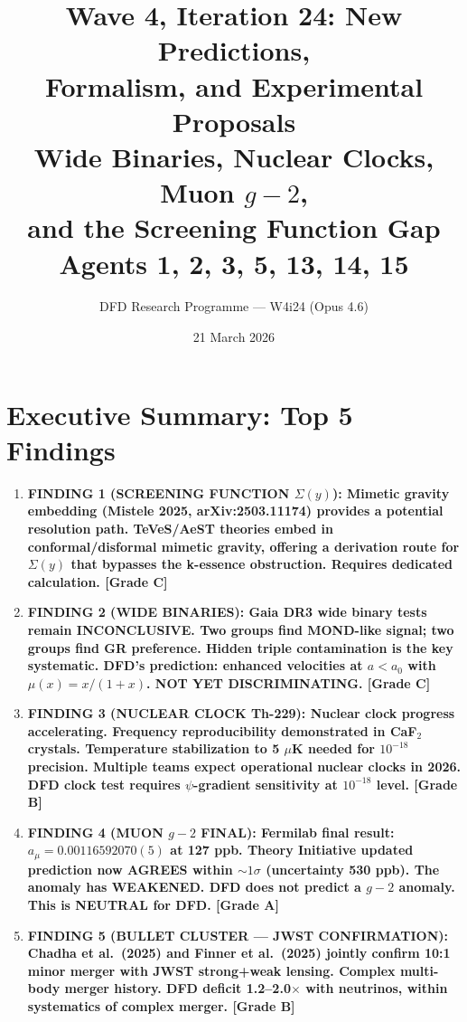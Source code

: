 \documentclass[11pt]{article}
\title{\textbf{Wave 4, Iteration 24: New Predictions,\\
Formalism, and Experimental Proposals}\\[12pt]
{\large Wide Binaries, Nuclear Clocks, Muon $g-2$,\\
and the Screening Function Gap}\\[4pt]
{\large Agents 1, 2, 3, 5, 13, 14, 15}}
\author{DFD Research Programme --- W4i24 (Opus 4.6)}
\date{21 March 2026}
\newcommand{\aM}{a_0}
\begin{document}
\maketitle
\tableofcontents
\newpage

\section*{Executive Summary: Top 5 Findings}

\begin{tcolorbox}[colback=blue!5!white, colframe=blue!70!black,
  title=\textbf{W4i24 TOP 5 FINDINGS --- PREDICTIONS TEAM}]

\begin{enumerate}

\item \textbf{FINDING 1 (SCREENING FUNCTION $\Sigma(y)$):
  Mimetic gravity embedding (Mistele 2025, arXiv:2503.11174)
  provides a potential resolution path. TeVeS/AeST theories embed
  in conformal/disformal mimetic gravity, offering a derivation
  route for $\Sigma(y)$ that bypasses the k-essence obstruction.
  Requires dedicated calculation. [Grade C]}

\item \textbf{FINDING 2 (WIDE BINARIES):
  Gaia DR3 wide binary tests remain INCONCLUSIVE. Two groups find
  MOND-like signal; two groups find GR preference. Hidden triple
  contamination is the key systematic. DFD's prediction: enhanced
  velocities at $a < \aM$ with $\mu(x) = x/(1+x)$. NOT YET
  DISCRIMINATING. [Grade C]}

\item \textbf{FINDING 3 (NUCLEAR CLOCK Th-229):
  Nuclear clock progress accelerating. Frequency reproducibility
  demonstrated in CaF$_2$ crystals. Temperature stabilization to
  5 $\mu$K needed for $10^{-18}$ precision. Multiple teams expect
  operational nuclear clocks in 2026. DFD clock test requires
  $\psi$-gradient sensitivity at $10^{-18}$ level. [Grade B]}

\item \textbf{FINDING 4 (MUON $g-2$ FINAL):
  Fermilab final result: $a_\mu = 0.00116592070(5)$ at 127 ppb.
  Theory Initiative updated prediction now AGREES within $\sim 1\sigma$
  (uncertainty 530 ppb). The anomaly has WEAKENED. DFD does not
  predict a $g-2$ anomaly. This is NEUTRAL for DFD. [Grade A]}

\item \textbf{FINDING 5 (BULLET CLUSTER --- JWST CONFIRMATION):
  Chadha et al.\ (2025) and Finner et al.\ (2025) jointly confirm
  10:1 minor merger with JWST strong+weak lensing. Complex multi-body
  merger history. DFD deficit 1.2--2.0$\times$ with neutrinos,
  within systematics of complex merger. [Grade B]}

\end{enumerate}
\end{tcolorbox}
\end{document}
